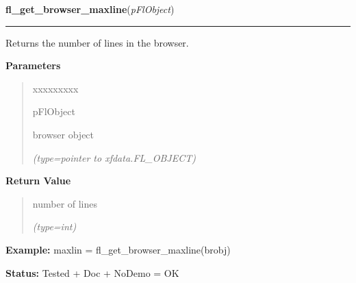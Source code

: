 \hspace{.8\funcindent}\begin{boxedminipage}{\funcwidth}

    \raggedright \textbf{fl\_get\_browser\_maxline}(\textit{pFlObject})

    \vspace{-1.5ex}

    \rule{\textwidth}{0.5\fboxrule}
\setlength{\parskip}{2ex}
    Returns the number of lines in the browser.

\setlength{\parskip}{1ex}
      \textbf{Parameters}
      \vspace{-1ex}

      \begin{quote}
        \begin{Ventry}{xxxxxxxxx}

          \item[pFlObject]

          browser object

            {\it (type=pointer to xfdata.FL\_OBJECT)}

        \end{Ventry}

      \end{quote}

      \textbf{Return Value}
    \vspace{-1ex}

      \begin{quote}
      number of lines

      {\it (type=int)}

      \end{quote}

\textbf{Example:} maxlin = fl\_get\_browser\_maxline(brobj)



\textbf{Status:} Tested + Doc + NoDemo = OK



    \end{boxedminipage}

    \label{xformslib:flbrowser:fl_get_browser_screenlines}

    \vspace{0.5ex}

